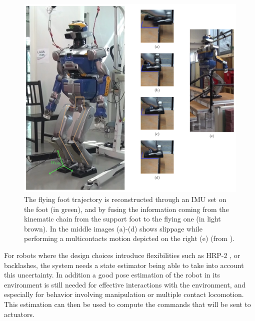 \begin{figure}
\centering
\includegraphics[width=\linewidth]{./figures/cover-figure.pdf}
	\caption{The flying foot trajectory is reconstructed through an IMU set on the foot (in green), and by fusing the information coming from the kinematic chain
        from the support foot to the flying one (in light brown). In the middle images (a)-(d) shows slippage while performing a multicontacts motion depicted on the
        right (e) (from \cite{Carpentier:ICRA:2016}).
 }
	\label{fig:cover}
\end{figure}

For robots where the design choices introduce flexibilities such as HRP-2 \cite{Nakaoka:iros:2007}, or backlashes, the system needs a state estimator being able to take into account this uncertainty.
In addition a good pose estimation of the robot in its environment is still needed for effective interactions with the environment,
and especially for behavior involving manipulation or multiple contact locomotion.
This estimation can then be used to compute the commands that will be sent to actuators.
%
%

